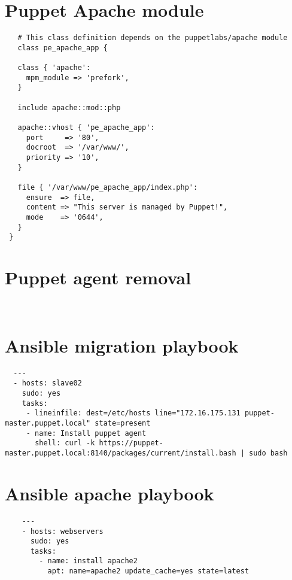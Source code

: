 \begin{appendices}
  \renewcommand\thetable{\thesection\arabic{table}}
  \renewcommand\thefigure{\thesection\arabic{figure}}

  \section{Puppet Apache module} \label{app:puppetmodule}
  \begin{lstlisting}
   # This class definition depends on the puppetlabs/apache module
   class pe_apache_app {

   class { 'apache':
     mpm_module => 'prefork',
   }

   include apache::mod::php

   apache::vhost { 'pe_apache_app':
     port     => '80',
     docroot  => '/var/www/',
     priority => '10',
   }

   file { '/var/www/pe_apache_app/index.php':
     ensure  => file,
     content => "This server is managed by Puppet!",
     mode    => '0644',
   }
 }
  \end{lstlisting}
  \newpage

  \section{Puppet agent removal} \label{app:puppetagent}
  \begin{lstlisting}
  
  \end{lstlisting}
  
  \newpage  
  \section{Ansible migration playbook} \label{app:ansiblemigration}
  \begin{lstlisting}
  ---
  - hosts: slave02
    sudo: yes
    tasks:
     - lineinfile: dest=/etc/hosts line="172.16.175.131 puppet-master.puppet.local" state=present
     - name: Install puppet agent
       shell: curl -k https://puppet-master.puppet.local:8140/packages/current/install.bash | sudo bash
  \end{lstlisting}

  \newpage
  \section{Ansible apache playbook} \label{app:ansibleplaybook}
  \begin{lstlisting}
    ---
    - hosts: webservers
      sudo: yes
      tasks:
        - name: install apache2
          apt: name=apache2 update_cache=yes state=latest


\end{lstlisting}
\end{appendices}
